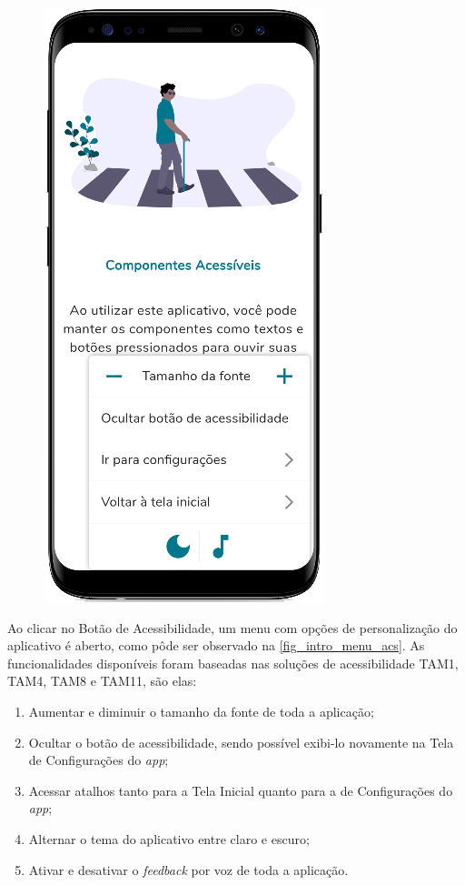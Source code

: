\begin{figure}[htb]
\begin{minipage}{0.45\textwidth}
        \includegraphics[scale=0.63]{Imagens/desenvolvimento/app/intro_menu_acs.png}
    \end{minipage}
\end{figure}

Ao clicar no Botão de Acessibilidade, um menu com opções de personalização do aplicativo é aberto,
como pôde ser observado na \autoref{fig_intro_menu_acs}. As funcionalidades disponíveis foram baseadas nas
soluções de acessibilidade TAM1, TAM4, TAM8 e TAM11, são elas:

\begin{enumerate}
    \item Aumentar e diminuir o tamanho da fonte de toda a aplicação;
    \item Ocultar o botão de acessibilidade, sendo possível exibi-lo novamente na Tela de Configurações do \emph{app};
    \item Acessar atalhos tanto para a Tela Inicial quanto para a de Configurações do \emph{app};
    \item Alternar o tema do aplicativo entre claro e escuro;
    \item Ativar e desativar o \emph{feedback} por voz de toda a aplicação.
\end{enumerate}

